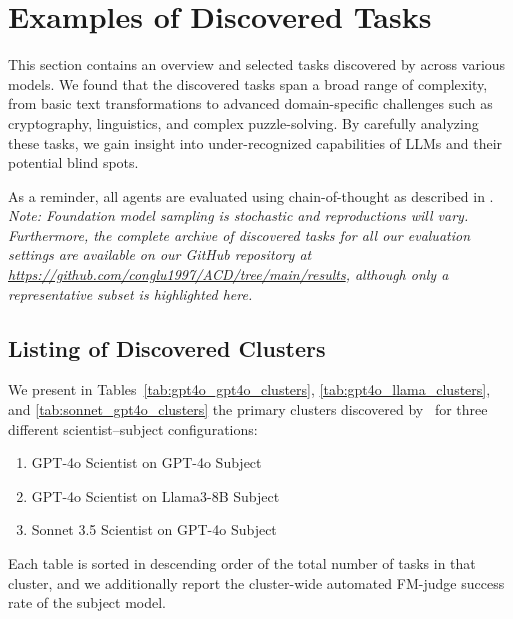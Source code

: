 \section{Examples of Discovered Tasks}
\label{appsec:task_examples}

This section contains an overview and selected tasks discovered by \ouralgo across various models. 
We found that the discovered tasks span a broad range of complexity, from basic text transformations to advanced domain-specific challenges such as cryptography, linguistics, and complex puzzle-solving. 
By carefully analyzing these tasks, we gain insight into under-recognized capabilities of LLMs and their potential blind spots.

As a reminder, all agents are evaluated using chain-of-thought as described in .
\emph{Note: Foundation model sampling is stochastic and reproductions will vary. Furthermore, the complete archive of discovered tasks for all our evaluation settings are available on our GitHub repository at \url{https://github.com/conglu1997/ACD/tree/main/results}, although only a representative subset is highlighted here.}

\subsection{Listing of Discovered Clusters}
\label{appsubsec:cluster_listings}

We present in Tables~\ref{tab:gpt4o_gpt4o_clusters}, \ref{tab:gpt4o_llama_clusters}, and \ref{tab:sonnet_gpt4o_clusters} the primary clusters discovered by \ouralgo\ for three different scientist–subject configurations:
\begin{enumerate}[leftmargin=2em]
    \item GPT-4o Scientist on GPT-4o Subject
    \item GPT-4o Scientist on Llama3-8B Subject
    \item Sonnet 3.5 Scientist on GPT-4o Subject
\end{enumerate}
Each table is sorted in descending order of the total number of tasks in that cluster, and we additionally report the cluster-wide automated FM-judge success rate of the subject model.

